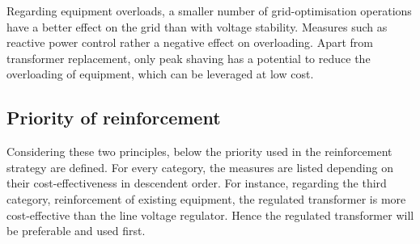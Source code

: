 Regarding equipment overloads, a smaller number of grid-optimisation operations have a better effect on the grid than with voltage stability. Measures such as reactive power control rather a negative effect on overloading. Apart from transformer replacement, only peak shaving has a potential to reduce the overloading of equipment, which can be leveraged at low cost.~\cite{mona}

\subsection{Priority of reinforcement}

Considering these two principles, below the priority used in the reinforcement strategy are defined. For every category, the measures are listed depending on their cost-effectiveness in descendent order. For instance, regarding the third category, reinforcement of existing equipment, the regulated transformer is more cost-effective than the line voltage regulator. Hence the regulated transformer will be preferable and used first. 


